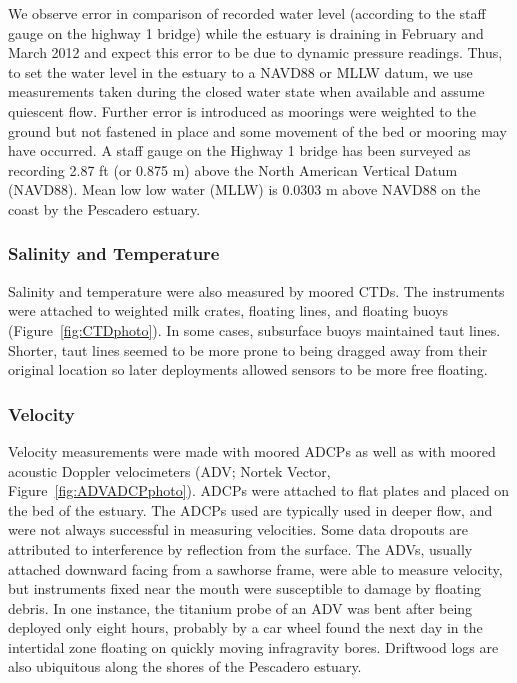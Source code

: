 We observe error in comparison of recorded water level (according to the
staff gauge on the highway 1 bridge) while the estuary is draining in
February and March 2012 and expect this error to be due to dynamic
pressure readings. Thus, to set the water level in the estuary to a
NAVD88 or MLLW datum, we use measurements taken during the closed water
state when available and assume quiescent flow.  Further error is introduced as
moorings were weighted to the ground but not fastened in place and some
movement of the bed or mooring may have occurred. A staff gauge on the Highway 1 bridge has been surveyed as recording 2.87 ft (or 0.875 m) above the North American Vertical Datum (NAVD88). Mean low low water (MLLW) is 0.0303 m above NAVD88 on the coast by the Pescadero estuary. 

\subsubsection{Salinity and Temperature} \label{sssec:SandT}
Salinity and temperature were also measured by moored CTDs. The instruments were attached to weighted milk crates, floating lines, and floating buoys (Figure~\ref{fig:CTDphoto}). In some cases, subsurface buoys maintained taut lines.  Shorter, taut lines seemed to be more prone to being dragged away from their original location so later deployments allowed sensors to be more free floating.

\subsubsection{Velocity} \label{sssec:velmeas}
Velocity measurements were made with moored ADCPs as well as with moored acoustic Doppler velocimeters (ADV; Nortek Vector, Figure~\ref{fig:ADVADCPphoto}). ADCPs were attached to flat plates and placed on the bed of the estuary. The ADCPs used are typically used in deeper flow, and were not always successful in measuring velocities. Some data dropouts are attributed to interference by reflection from the surface. The ADVs, usually attached downward facing from a sawhorse frame, were able to measure velocity, but instruments fixed near the mouth were susceptible to damage by floating debris. In one instance, the titanium probe of an ADV was bent after being deployed only eight hours, probably by a car wheel found the next day in the intertidal zone floating on quickly moving infragravity bores. Driftwood logs are also ubiquitous along the shores of the Pescadero estuary.


